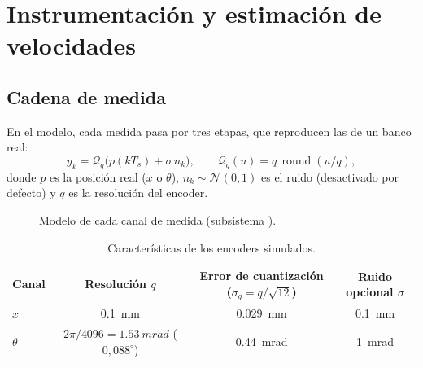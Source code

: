 \chapter{Instrumentación y estimación de velocidades}
\label{cap:sensores}

\section{Cadena de medida}

En el modelo, cada medida pasa por tres etapas, que reproducen las de un banco real:
\begin{equation}
y_k = \mathcal{Q}_q\big(p(kT_s) + \sigma\,n_k\big),\qquad
\mathcal{Q}_q(u)=q\,\operatorname{round}(u/q),
\end{equation}
donde $p$ es la posición real ($x$ o $\theta$), $n_k\sim\mathcal N(0,1)$ es el ruido (desactivado por defecto) y $q$ es la resolución del encoder.

\begin{figure}[H]
\centering
{}
\caption{Modelo de cada canal de medida (subsistema ).}
\end{figure}

\begin{table}[H]
\centering\small
\begin{tabular}{@{}lccc@{}}
\toprule
Canal & Resolución $q$ & Error de cuantización ($\sigma_q=q/\sqrt{12}$) & Ruido opcional $\sigma$\\
\midrule
$x$ & \SI{0.1}{mm} & \SI{0.029}{mm} & \SI{0.1}{mm}\\
$\theta$ & $2\pi/4096=\SI{1.53}{mrad}$ ($0{,}088^\circ$) & \SI{0.44}{mrad} & \SI{1}{mrad}\\
\bottomrule
\end{tabular}
\caption{Características de los encoders simulados.}
\end{table}

